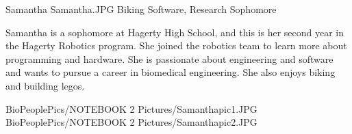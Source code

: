 \insertbio
{Samantha}
{Samantha.JPG}
{Biking}
{Software, Research}
{Sophomore}
{
Samantha is a sophomore at Hagerty High School, and this is her second year in the Hagerty Robotics program. She joined the robotics team to learn more about programming and hardware. She is passionate about engineering and software and wants to pursue a career in biomedical engineering. She also enjoys biking and building legos.

}
{BioPeoplePics/NOTEBOOK 2 Pictures/Samanthapic1.JPG}
{BioPeoplePics/NOTEBOOK 2 Pictures/Samanthapic2.JPG}
